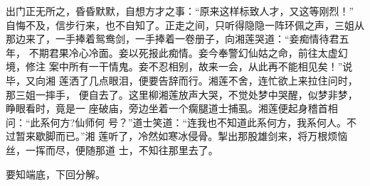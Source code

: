 出门正无所之，昏昏默默，自想方才之事：“原来这样标致人才，又这等刚烈！”
自悔不及，信步行来，也不自知了。正走之间，只听得隐隐一阵环佩之声，三姐从
那边来了，一手捧着鸳鸯剑，一手捧着一卷册子，向湘莲哭道：“妾痴情待君五年，
不期君果冷心冷面。妾以死报此痴情。妾今奉警幻仙姑之命，前往太虚幻境，修注
案中所有一干情鬼。妾不忍相别，故来一会，从此再不能相见矣！”说毕，又向湘
莲洒了几点眼泪，便要告辞而行。湘莲不舍，连忙欲上来拉住问时，那三姐一摔手，
便自去了。这里柳湘莲放声大哭，不觉处梦中哭醒，似梦非梦，睁眼看时，竟是一
座破庙，旁边坐着一个瘸腿道士捕虱。湘莲便起身稽首相问：“此系何方?仙师何
号？”道士笑道：“连我也不知道此系何方，我系何人。不过暂来歇脚而已。”湘
莲听了，冷然如寒冰侵骨。掣出那股雄剑来，将万根烦恼丝，一挥而尽，便随那道
士，不知往那里去了。

要知端底，下回分解。